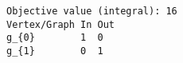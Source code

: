 \begin{verbatim}
Objective value (integral): 16
Vertex/Graph In Out 
g_{0}        1  0   
g_{1}        0  1   
\end{verbatim}
